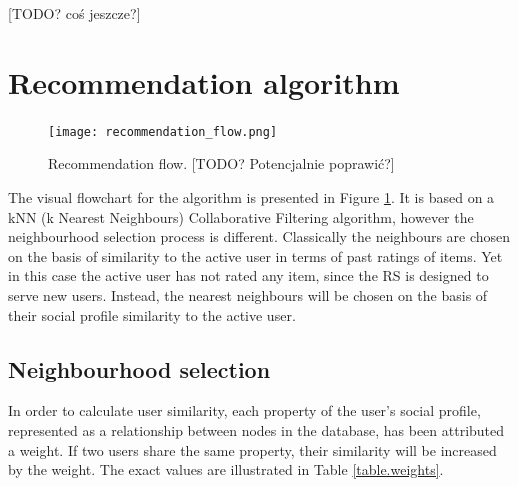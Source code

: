 \documentclass[12pt]{report}
\begin{document}
[TODO? coś jeszcze?]

\section{Recommendation algorithm}


\begin{figure}
\centering
\texttt{[image: recommendation\_flow.png]} 
\caption[Recommendation flow.]{Recommendation flow. [TODO? Potencjalnie poprawić?]}
\label{fig.recommendation_flow}
\end{figure}

The visual flowchart for the algorithm is presented in Figure \ref{fig.recommendation_flow}. It is based on a kNN (k Nearest Neighbours) Collaborative Filtering algorithm, however the neighbourhood selection process is different. Classically the neighbours are chosen on the basis of similarity to the active user in terms of past ratings of items. Yet in this case the active user has not rated any item, since the RS is designed to serve new users. Instead, the nearest neighbours will be chosen on the basis of their social profile similarity to the active user.

\subsection{Neighbourhood selection}

In order to calculate user similarity, each property of the user's social profile, represented as a relationship between nodes in the database, has been attributed a weight. If two users share the same property, their similarity will be increased by the weight. The exact values are illustrated in Table \ref{table.weights}.

\end{document}

